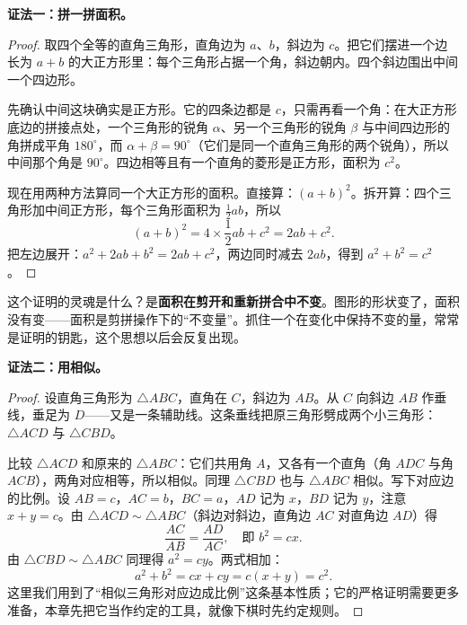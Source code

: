 \textbf{证法一：拼一拼面积。}

\begin{center}
\end{center}

\begin{proof}
取四个全等的直角三角形，直角边为 $a$、$b$，斜边为 $c$。把它们摆进一个边长为 $a+b$ 的大正方形里：每个三角形占据一个角，斜边朝内。四个斜边围出中间一个四边形。

先确认中间这块确实是正方形。它的四条边都是 $c$，只需再看一个角：在大正方形底边的拼接点处，一个三角形的锐角 $\alpha$、另一个三角形的锐角 $\beta$ 与中间四边形的角拼成平角 $180^\circ$，而 $\alpha+\beta=90^\circ$（它们是同一个直角三角形的两个锐角），所以中间那个角是 $90^\circ$。四边相等且有一个直角的菱形是正方形，面积为 $c^2$。

现在用两种方法算同一个大正方形的面积。直接算：$(a+b)^2$。拆开算：四个三角形加中间正方形，每个三角形面积为 $\frac{1}{2}ab$，所以
\[
(a+b)^2=4\times\frac{1}{2}ab+c^2=2ab+c^2.
\]
把左边展开：$a^2+2ab+b^2=2ab+c^2$，两边同时减去 $2ab$，得到 $a^2+b^2=c^2$。
\end{proof}

这个证明的灵魂是什么？是\textbf{面积在剪开和重新拼合中不变}。图形的形状变了，面积没有变——面积是剪拼操作下的“不变量”。抓住一个在变化中保持不变的量，常常是证明的钥匙，这个思想以后会反复出现。

\textbf{证法二：用相似。}

\begin{proof}
设直角三角形为 $\triangle ABC$，直角在 $C$，斜边为 $AB$。从 $C$ 向斜边 $AB$ 作垂线，垂足为 $D$——又是一条辅助线。这条垂线把原三角形劈成两个小三角形：$\triangle ACD$ 与 $\triangle CBD$。

比较 $\triangle ACD$ 和原来的 $\triangle ABC$：它们共用角 $A$，又各有一个直角（角 $ADC$ 与角 $ACB$），两角对应相等，所以相似。同理 $\triangle CBD$ 也与 $\triangle ABC$ 相似。写下对应边的比例。设 $AB=c$，$AC=b$，$BC=a$，$AD$ 记为 $x$，$BD$ 记为 $y$，注意 $x+y=c$。由 $\triangle ACD \sim \triangle ABC$（斜边对斜边，直角边 $AC$ 对直角边 $AD$）得
\[
\frac{AC}{AB}=\frac{AD}{AC},\quad\text{即 } b^2=cx.
\]
由 $\triangle CBD \sim \triangle ABC$ 同理得 $a^2=cy$。两式相加：
\[
a^2+b^2=cx+cy=c(x+y)=c^2.
\]
这里我们用到了“相似三角形对应边成比例”这条基本性质；它的严格证明需要更多准备，本章先把它当作约定的工具，就像下棋时先约定规则。
\end{proof}

